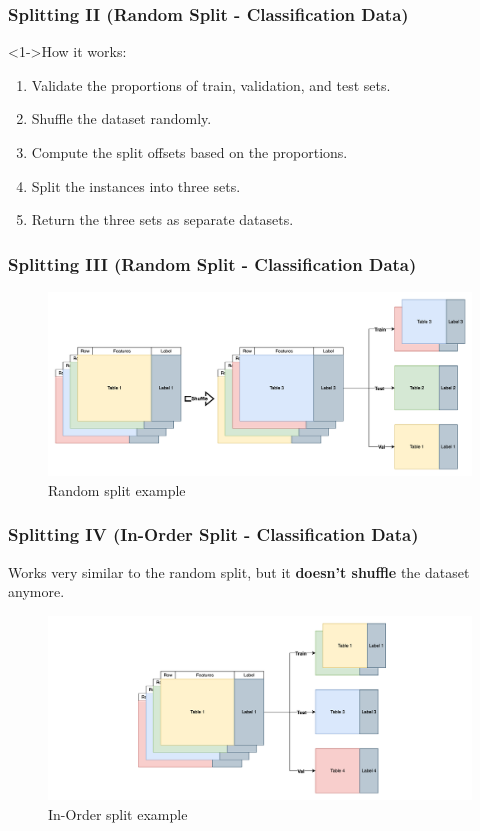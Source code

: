 \documentclass[t,english]{beamer}
\begin{document}
\begin{frame}
  \frametitle{Splitting II (Random Split - Classification Data)}
    \begin{block}<1->{How it works:}
      \begin{enumerate}
        \item<1-> Validate the proportions of train, validation, and test sets.
        \item <2-> Shuffle the dataset randomly.
        \item <3-> Compute the split offsets based on the proportions.
        \item <4-> Split the instances into three sets.
        \item <5-> Return the three sets as separate datasets.
      \end{enumerate}
    \end{block}
\end{frame}

\begin{frame}
  \frametitle{Splitting III (Random Split - Classification Data)}
    \begin{figure}[H]
        \includegraphics[width=1\textwidth]{figures/splitting/random_split.png}
        \caption{Random split example}
        \label{fig:random_split}
    \end{figure}
\end{frame}

\begin{frame}
  \frametitle{Splitting IV (In-Order Split - Classification Data)}
    Works very similar to the random split, but it \textbf{doesn't shuffle} the dataset anymore.

    \begin{figure}[H]
        \includegraphics[width=1\textwidth]{figures/splitting/in_order_split.png}
        \caption{In-Order split example}
        \label{fig:in_order_split}
    \end{figure}
\end{frame}
\end{document}
